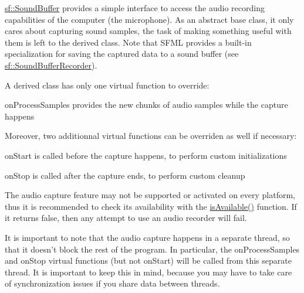 \hyperlink{classsf_1_1SoundBuffer}{sf\-::\-Sound\-Buffer} provides a simple interface to access the audio recording capabilities of the computer (the microphone). As an abstract base class, it only cares about capturing sound samples, the task of making something useful with them is left to the derived class. Note that S\-F\-M\-L provides a built-\/in specialization for saving the captured data to a sound buffer (see \hyperlink{classsf_1_1SoundBufferRecorder}{sf\-::\-Sound\-Buffer\-Recorder}).

A derived class has only one virtual function to override\-: \begin{DoxyItemize}
\item on\-Process\-Samples provides the new chunks of audio samples while the capture happens\end{DoxyItemize}
Moreover, two additionnal virtual functions can be overriden as well if necessary\-: \begin{DoxyItemize}
\item on\-Start is called before the capture happens, to perform custom initializations \item on\-Stop is called after the capture ends, to perform custom cleanup\end{DoxyItemize}
The audio capture feature may not be supported or activated on every platform, thus it is recommended to check its availability with the \hyperlink{classsf_1_1SoundRecorder_aab2bd0fee9e48d6cfd449b1cb078ce5a}{is\-Available()} function. If it returns false, then any attempt to use an audio recorder will fail.

It is important to note that the audio capture happens in a separate thread, so that it doesn't block the rest of the program. In particular, the on\-Process\-Samples and on\-Stop virtual functions (but not on\-Start) will be called from this separate thread. It is important to keep this in mind, because you may have to take care of synchronization issues if you share data between threads.

